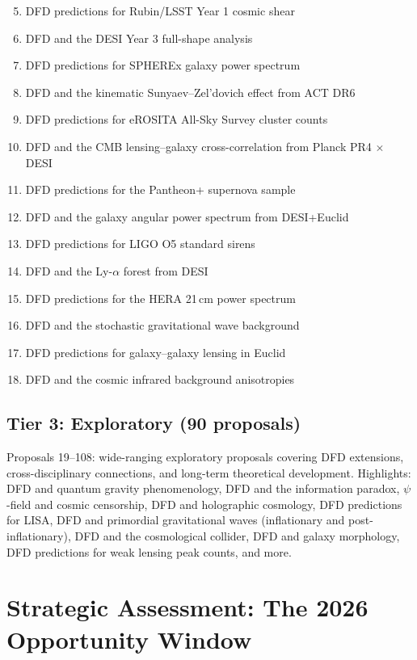 \documentclass[11pt,a4paper]{article}
\begin{document}
\begin{enumerate}[nosep]
\setcounter{enumi}{4}
\item DFD predictions for Rubin/LSST Year 1 cosmic shear
\item DFD and the DESI Year 3 full-shape analysis
\item DFD predictions for SPHEREx galaxy power spectrum
\item DFD and the kinematic Sunyaev--Zel'dovich effect from ACT DR6
\item DFD predictions for eROSITA All-Sky Survey cluster counts
\item DFD and the CMB lensing--galaxy cross-correlation from Planck PR4 $\times$ DESI
\item DFD predictions for the Pantheon+ supernova sample
\item DFD and the galaxy angular power spectrum from DESI+Euclid
\item DFD predictions for LIGO O5 standard sirens
\item DFD and the Ly-$\alpha$ forest from DESI
\item DFD predictions for the HERA 21\,cm power spectrum
\item DFD and the stochastic gravitational wave background
\item DFD predictions for galaxy--galaxy lensing in Euclid
\item DFD and the cosmic infrared background anisotropies
\end{enumerate}

\subsection{Tier 3: Exploratory (90 proposals)}

Proposals 19--108: wide-ranging exploratory proposals covering DFD extensions, cross-disciplinary connections, and long-term theoretical development. Highlights: DFD and quantum gravity phenomenology, DFD and the information paradox, $\psi$-field and cosmic censorship, DFD and holographic cosmology, DFD predictions for LISA, DFD and primordial gravitational waves (inflationary and post-inflationary), DFD and the cosmological collider, DFD and galaxy morphology, DFD predictions for weak lensing peak counts, and more.

\section{Strategic Assessment: The 2026 Opportunity Window}
\end{document}
